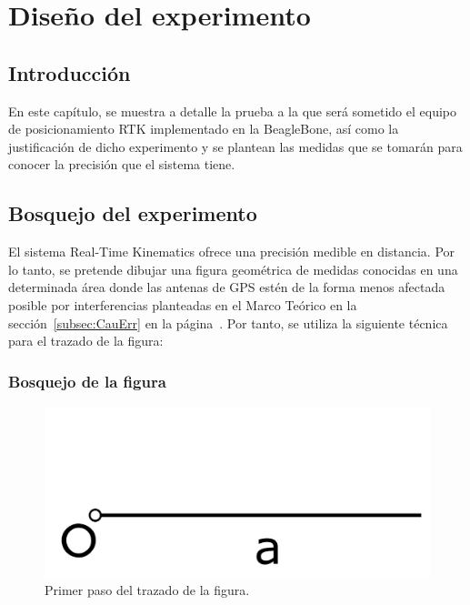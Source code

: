 
\chapter{Diseño del experimento}
\label{Chap:DisExp} %


\section{Introducción}

En este capítulo, se muestra a detalle la prueba a la que será sometido el equipo de posicionamiento RTK implementado en la BeagleBone, así como la justificación de dicho experimento y se plantean las medidas que se tomarán para conocer la precisión que el sistema tiene.

\section{Bosquejo del experimento}

El sistema Real-Time Kinematics ofrece una precisión medible en distancia. Por lo tanto, se pretende dibujar una figura geométrica de medidas conocidas en una determinada área donde las antenas de GPS estén de la forma menos afectada posible por interferencias planteadas en el Marco Teórico en la sección~\ref{subsec:CauErr} en la página~\pageref{subsec:CauErr}. Por tanto, se utiliza la siguiente técnica para el trazado de la figura:

\subsection{Bosquejo de la figura}

\begin{figure}[H]
\centering
\includegraphics[scale=0.95]{Figures/Cuad1}
\caption[Primer paso del trazado de la figura.]{Primer paso del trazado de la figura.}
\label{fig:TrazFig1}
\end{figure}

